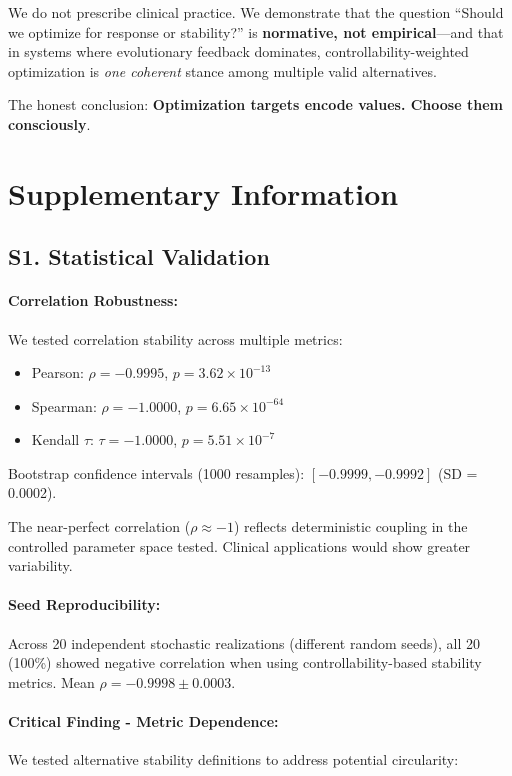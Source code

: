 \documentclass[11pt,a4paper]{article}
\begin{document}
We do not prescribe clinical practice. We demonstrate that the question ``Should we optimize for response or stability?'' is \textbf{normative, not empirical}---and that in systems where evolutionary feedback dominates, controllability-weighted optimization is \textit{one coherent} stance among multiple valid alternatives.

The honest conclusion: \textbf{Optimization targets encode values. Choose them consciously}.

\section*{Supplementary Information}

\subsection*{S1. Statistical Validation}

\paragraph{Correlation Robustness:}
We tested correlation stability across multiple metrics:
\begin{itemize}
    \item Pearson: $\rho = -0.9995$, $p = 3.62 \times 10^{-13}$
    \item Spearman: $\rho = -1.0000$, $p = 6.65 \times 10^{-64}$
    \item Kendall $\tau$: $\tau = -1.0000$, $p = 5.51 \times 10^{-7}$
\end{itemize}

Bootstrap confidence intervals (1000 resamples): $[-0.9999, -0.9992]$ (SD = 0.0002).

The near-perfect correlation ($\rho \approx -1$) reflects deterministic coupling in the controlled parameter space tested. Clinical applications would show greater variability.

\paragraph{Seed Reproducibility:}
Across 20 independent stochastic realizations (different random seeds), all 20 (100\%) showed negative correlation when using controllability-based stability metrics. Mean $\rho = -0.9998 \pm 0.0003$.

\paragraph{Critical Finding - Metric Dependence:}
We tested alternative stability definitions to address potential circularity:
\end{document}
